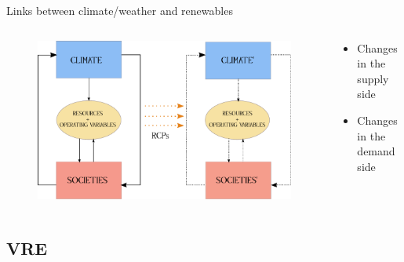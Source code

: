\documentclass{beamer}%
\begin{document}
\begin{frame}[fragile]{Links between climate/weather and renewables}
  \begin{columns}
    \begin{column}{0.7\textwidth}
  \begin{figure}
    \centering\includegraphics[scale=0.55]{drawing.pdf}
\end{figure}
  \end{column}
  \begin{column}{0.3\textwidth}
    \begin{itemize}
    \item Changes in the supply side
     \item Changes in the demand side 
      \end{itemize}
    \end{column}
    \end{columns}
\end{frame}


\subsection{VRE}
 
\end{document}
